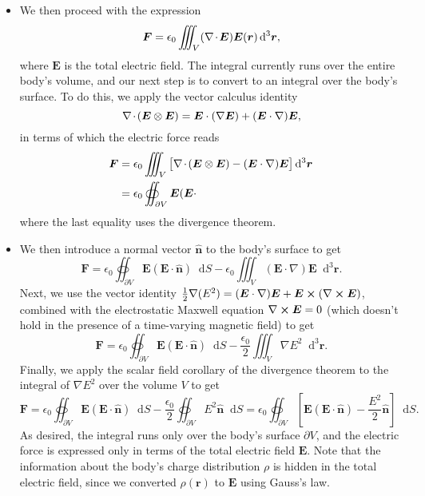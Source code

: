 \documentclass[11pt, a4paper]{article}
\newcommand{\diff}{\mathop{}\!\mathrm{d}} %
\newcommand{\dr}{\diff^{3} \r}  %
\renewcommand{\vec}[1]{\bm{#1}} %
\newcommand{\uvec}[1]{\hat{\vec{#1}}} %
\renewcommand{\r}{\vec{r}}
\newcommand{\E}{\vec{E}} %
\newcommand{\ee}{\epsilon_{0}}  %
\renewcommand{\div}{\nabla \mspace{-2mu} \cdot \mspace{-2mu}}
\renewcommand{\curl}{\nabla \cross}
\renewcommand{\grad}{\nabla}
\begin{document}
\begin{itemize}
    \item We then proceed with the expression
	\begin{equation*}
		\vec{F} = \ee \iiint_{V} (\div \E) \E(\r) \dr,
	\end{equation*}
	where $ \E $ is the total electric field. The integral currently runs over the entire body's volume, and our next step is to convert to an integral over the body's surface. To do this, we apply the vector calculus identity
	\begin{equation*}
		\div (\E \otimes \E) = \E \cdot (\grad \E) + (\E \cdot \grad) \E,
	\end{equation*}
	in terms of which the electric force reads
	\begin{align*}
		\vec{F} &= \ee \iiint_{V} \big[\div (\E \otimes \E) - (\E \cdot \grad) \E \big] \dr \\
		& = \ee \oiint_{\partial V} \E(\E \cdot
	\end{align*}
	where the last equality uses the divergence theorem. 
	
	\item We then introduce a normal vector $ \uvec{n} $ to the body's surface to get
	\begin{equation*}
		\vec{F} = \ee \oiint_{\partial V} \E (\E \cdot \uvec{n}) \diff S - \ee \iiint_{V} (\E \cdot \grad)\E \dr.
	\end{equation*}
	Next, we use the vector identity $ \frac{1}{2} \grad (E^{2}) = (\E \cdot \grad)\E + \E \cross (\curl \E) $, combined with the electrostatic Maxwell equation $ \curl \E = 0 $ (which doesn't hold in the presence of a time-varying magnetic field) to get
	\begin{equation*}
		\vec{F} = \ee \oiint_{\partial V} \E (\E \cdot \uvec{n}) \diff S - \frac{\ee}{2} \iiint_{V} \grad E^{2}\dr.
	\end{equation*}
	Finally, we apply the scalar field corollary of the divergence theorem to the integral of $ \grad E^{2} $ over the volume $ V $ to get
	\begin{equation*}
		\vec{F} = \ee \oiint_{\partial V} \E (\E \cdot \uvec{n}) \diff S - \frac{\ee}{2} \oiint_{\partial V}E^{2}\uvec{n} \diff S = \ee \oiint_{\partial V} \left[\E(\E\cdot \uvec{n}) - \frac{E^{2}}{2}\uvec{n} \right] \diff S.
	\end{equation*}
	As desired, the integral runs only over the body's surface $ \partial V $, and the electric force is expressed only in terms of the total electric field $ \E $. Note that the information about the body's charge distribution $ \rho $ is hidden in the total electric field, since we converted $ \rho(\r) $ to $ \E $ using Gauss's law.
	
\end{itemize}
\end{document}
